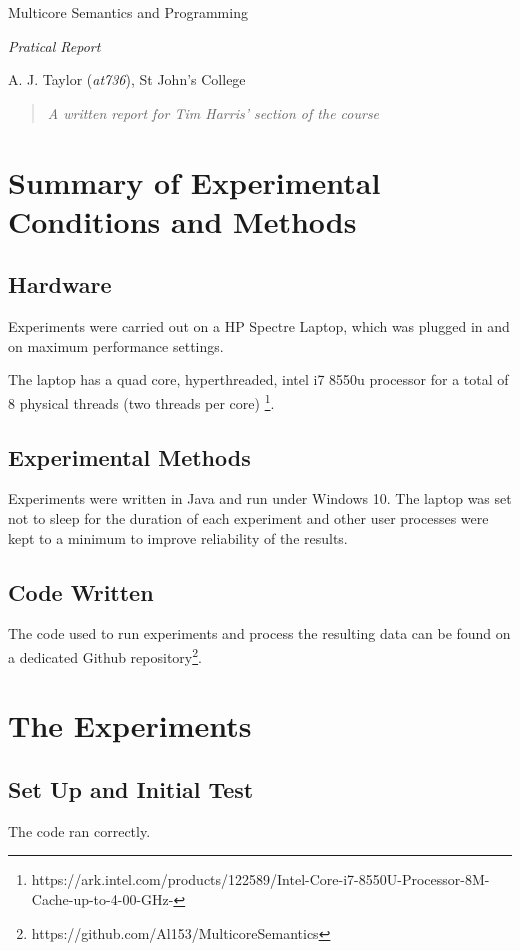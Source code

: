 \documentclass[11pt]{article}
\begin{document}
\centerline{\Large Multicore Semantics and Programming}
\vspace{2em}
\centerline{\Large \emph{Pratical Report}}
\vspace{2em}
\centerline{\large A. J. Taylor (\emph{at736}), St John's College}
\vspace{1em}

\begin{abstract}
\textsl{
	A written report for Tim Harris' section of the course
} 
\end{abstract}


\section{Summary of Experimental Conditions and Methods}

\subsection{Hardware}
Experiments were carried out on a HP Spectre Laptop, which was plugged in and on maximum performance settings. 

The laptop has a quad core, hyperthreaded, intel i7 8550u processor for a total of 8 physical threads (two threads per core) \footnote{https://ark.intel.com/products/122589/Intel-Core-i7-8550U-Processor-8M-Cache-up-to-4-00-GHz-}.

\subsection{Experimental Methods}
Experiments were written in Java and run under Windows 10. The laptop was set not to sleep for the duration of each experiment and other user processes were kept to a minimum to improve reliability of the results.

\subsection{Code Written}
The code used to run experiments and process the resulting data can be found on a dedicated Github repository\footnote{https://github.com/Al153/MulticoreSemantics}.


\section{The Experiments}
\subsection{Set Up and Initial Test}
The code ran correctly.
\end{document}
